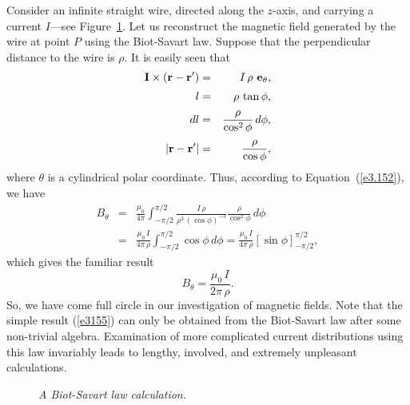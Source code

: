 Consider  an infinite straight wire, directed along the
$z$-axis, and carrying a current $I$---see Figure~\ref{f32}.
Let us reconstruct the magnetic field generated by the wire at point
$P$ using the Biot-Savart
law. Suppose that the perpendicular distance to the wire is $\rho$. It is
easily seen that
\begin{eqnarray}
{\bf I} \times({\bf r} - {\bf r}') &= &I\,\rho\,\,{\bf e}_\theta,\\[0.5ex]
l &=& \rho\,\tan\phi,\\[0.5ex]
dl &=& \frac{\rho}{\cos^2\phi} \,d\phi,\\[0.5ex]
|{\bf r} - {\bf r}'| &=& \frac{\rho}{\cos\phi},
\end{eqnarray}
where $\theta$ is a cylindrical polar coordinate.
Thus, according to Equation~(\ref{e3.152}), we have
\begin{eqnarray}
B_\theta& = &\frac{\mu_0}{4\pi}  \int_{-\pi/2}^{\pi/2} \frac{I\,\rho}
{\rho^3 \,(\cos\phi)^{-3}}\frac{\rho}{\cos^2\phi} \,d\phi\nonumber\\[0.5ex]
&=&\frac{\mu_0 \,I}{4\pi \,\rho} \int_{-\pi/2}^{\pi/2} \cos\phi\,d\phi
= \frac{\mu_0 \,I}{4\pi \,\rho} \left[ \sin\phi\right]_{-\pi/2}^{\pi/2},
\end{eqnarray}
which gives the familiar result
\begin{equation}
B_\theta = \frac{\mu_0 \,I}{2\pi\, \rho}.\label{e3155}
\end{equation}
So, we have come full circle in our investigation of magnetic fields.
Note that  the simple result (\ref{e3155}) can only be obtained from the Biot-Savart law
after some non-trivial algebra. 
Examination  of
more complicated current distributions using this law invariably
leads to  lengthy, involved,  and extremely unpleasant
calculations. 
\begin{figure}
\epsfysize=2.5in
\centerline{}
\caption{\em A Biot-Savart law calculation.}\label{f32}
\end{figure}

